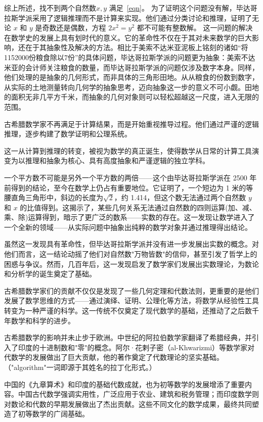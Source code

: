 综上所述，找不到两个自然数$x,y$ 满足~\eqref{eqn}。
为了证明这个问题没有解，毕达哥拉斯学派采用了逻辑推理而不是计算来实现。他们通过分类讨论和推理，证明了无论 $x$ 和 $y$ 是奇数还是偶数，方程 $2x^2 = y^2$ 都不可能有整数解。
这一问题的解决在数学史的发展上具有划时代的意义。它的革命性不仅在于其对未来数学的巨大影响，还在于其抽象性及解决的方法。相比于美索不达米亚泥板上铭刻的诸如“将1152000份粮食除以7份”的具体问题，毕达哥拉斯学派的问题更为抽象：美索不达米亚的会计师关注粮食的数量，而毕达哥拉斯学派的问题仅涉及数字本身。同样，他们处理的是抽象的几何形式，而非具体的三角形田地。从从粮食的份数到数字，从实际的土地测量转向几何学的抽象思考，迈向抽象这一步的意义不可小觑。田地的面积无非几平方千米，而抽象的几何对象则可以轻松超越这一尺度，进入无限的范围。


古希腊数学家不再满足于计算结果，而是开始重视推导过程。他们通过严谨的逻辑推理，逐步构建了数学证明和公理系统。

这一从计算到推理的转变，被视为数学的真正诞生，使得数学从日常的计算工具演变为以推理和抽象为核心、具有高度抽象和严谨逻辑的独立学科。

一个平方数不可能是另外一个平方数的两倍——这个由毕达哥拉斯学派在 2500 年前得到的结论，至今在数学上仍占有重要地位。它证明了，一个短边为 1 米的等腰直角三角形中，斜边的长度为$\sqrt{2}$，约 1.414，但这个数无法通过两个自然数 $y$ 和 $x$ 的比值得到。这揭示了，某些几何关系无法通过自然数的四则运算(加、减、乘、除)运算得到，暗示了更广泛的数系——实数的存在。这一发现让数学进入了一个全新的领域——从实际问题中抽象出纯粹的数学对象并通过推理得出结论。

虽然这一发现具有革命性，但毕达哥拉斯学派并没有进一步发展出实数的概念。对他们而言，这一结论动摇了他们对自然数"万物皆数"的信仰，甚至引发了哲学上的困惑与争议。然而，几百年后，这一发现启发了数学家们发展出实数理论，为数论和分析学的诞生奠定了基础。

古希腊数学家们的贡献不仅仅是发现了一些几何定理和代数法则，更重要的是他们发展了数学思维的方式——通过演绎、证明、公理化等方法，将数学从经验性工具转变为一种严谨的科学。这一传统不仅奠定了现代数学的基础，还推动了之后数千年数学和科学的进步。

古希腊数学的影响并未止步于欧洲。中世纪的阿拉伯数学家翻译了希腊经典，并引入了印度的十进制数和"零"的概念。阿尔·花剌子密（al-Khwarizmi）等数学家对代数学的发展做出了巨大贡献，他的著作奠定了代数理论的坚实基础。（"algorithm"一词即源于其姓名的拉丁化形式。）

中国的《九章算术》和印度的基础代数成就，也为初等数学的发展增添了重要内容。中国古代数学强调实用性，广泛应用于农业、建筑和税务管理；而印度数学则对数论和代数的早期发展做出了杰出贡献。这些不同文化的数学成果，最终共同塑造了初等数学的广阔基础。

